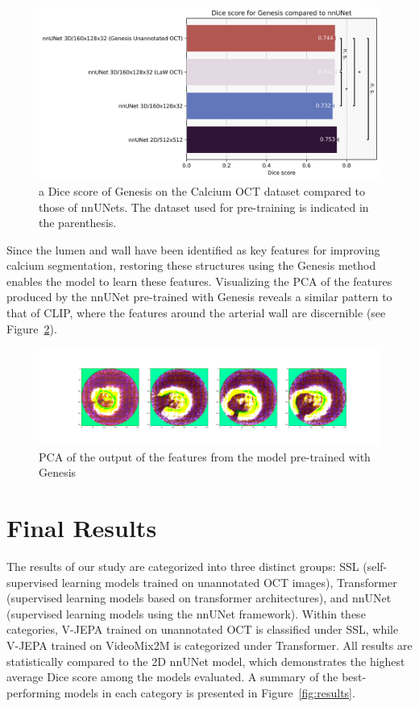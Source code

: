 \documentclass[a4paper,11pt,oneside]{report}
\begin{document}
\begin{figure}[h]
    \centering
    \includegraphics[width=0.65\linewidth]{figures/result_nnUNet_and_Genesis_results.png}
    \caption{a Dice score of Genesis on the Calcium OCT dataset compared to those of nnUNets. The dataset used for pre-training is indicated in the parenthesis.
    }
    \label{fig:genesis-results}    
\end{figure}

Since the lumen and wall have been identified as key features for improving calcium segmentation, restoring these structures using the Genesis method enables the model to learn these features. Visualizing the PCA of the features produced by the nnUNet pre-trained with Genesis reveals a similar pattern to that of CLIP, where the features around the arterial wall are discernible (see Figure~\ref{fig:pca-genesis}).

\begin{figure}[h]
    \centering
    \includegraphics[width=0.5\linewidth]{figures/discussion_genesis_feature_map_batch0_feature1.png}
    \caption{PCA of the output of the features from the model pre-trained with Genesis}
    \label{fig:pca-genesis}
\end{figure}


\section{Final Results}
The results of our study are categorized into three distinct groups: SSL (self-supervised learning models trained on unannotated OCT images), Transformer (supervised learning models based on transformer architectures), and nnUNet (supervised learning models using the nnUNet framework). Within these categories, V-JEPA trained on unannotated OCT is classified under SSL, while V-JEPA trained on VideoMix2M is categorized under Transformer. All results are statistically compared to the 2D nnUNet model, which demonstrates the highest average Dice score among the models evaluated. A summary of the best-performing models in each category is presented in Figure~\ref{fig:results}.
\end{document}
